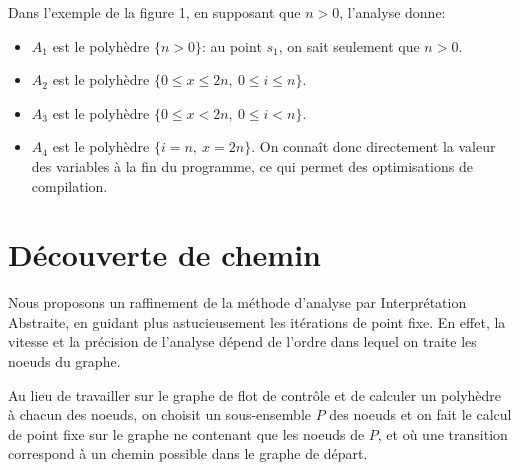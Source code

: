 \documentclass{llncs}
\begin{document}
Dans l'exemple de la figure 1, en supposant que $n>0$, l'analyse donne:
\begin{itemize}
\item $A_1$ est le polyhèdre $\{n>0\}$: au point $s_1$, on sait
seulement que $n>0$.
\item $A_2$ est le polyhèdre $\{0 \leq x \leq 2n,\ 0 \leq i \leq n\}$.
\item $A_3$ est le polyhèdre $\{0 \leq x < 2n,\ 0 \leq i < n\}$.
\item $A_4$ est le polyhèdre $\{i=n,\ x=2n\}$. On connaît donc directement la
valeur des variables à la fin du programme, ce qui permet des optimisations de
compilation.
\end{itemize}

\section{Découverte de chemin}

Nous proposons un raffinement de la méthode d'analyse par Interprétation
Abstraite, en guidant plus astucieusement les itérations de point fixe. En
effet, la vitesse et la précision de l'analyse dépend de l'ordre dans lequel on
traite les noeuds du graphe.

Au lieu de travailler sur le graphe de flot de contrôle et de calculer un
polyhèdre à chacun des noeuds, on choisit un sous-ensemble $P$ des noeuds et on fait
le calcul de point fixe sur le graphe ne contenant que les noeuds de $P$, et où
une transition correspond à un chemin possible dans le graphe de départ.
\end{document}
